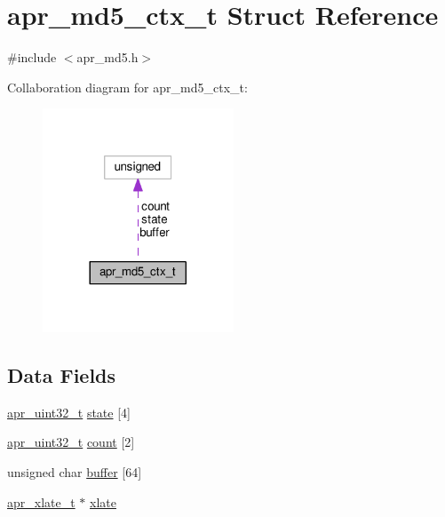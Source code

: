 \hypertarget{structapr__md5__ctx__t}{}\section{apr\+\_\+md5\+\_\+ctx\+\_\+t Struct Reference}
\label{structapr__md5__ctx__t}


{\ttfamily \#include $<$apr\+\_\+md5.\+h$>$}



Collaboration diagram for apr\+\_\+md5\+\_\+ctx\+\_\+t\+:
\nopagebreak
\begin{figure}[H]
\begin{center}
\leavevmode
\includegraphics[width=161pt]{structapr__md5__ctx__t__coll__graph}
\end{center}
\end{figure}
\subsection*{Data Fields}
\begin{DoxyCompactItemize}
\item 
\hyperlink{group__apr__platform_ga558548a135d8a816c4787250744ea147}{apr\+\_\+uint32\+\_\+t} \hyperlink{structapr__md5__ctx__t_ab8acbc6cd7a3dcd16e66e64a7f5357b5}{state} \mbox{[}4\mbox{]}
\item 
\hyperlink{group__apr__platform_ga558548a135d8a816c4787250744ea147}{apr\+\_\+uint32\+\_\+t} \hyperlink{structapr__md5__ctx__t_a3234a76e68a4ef546026a9854f9ba6d0}{count} \mbox{[}2\mbox{]}
\item 
unsigned char \hyperlink{structapr__md5__ctx__t_aed43a8aefc65c8973dbae804c94ad1e3}{buffer} \mbox{[}64\mbox{]}
\item 
\hyperlink{group__APR__XLATE_ga069dabbadc30e3a4157c38104a250e77}{apr\+\_\+xlate\+\_\+t} $\ast$ \hyperlink{structapr__md5__ctx__t_a391a62bc9e7fada71d03f786df4f49ba}{xlate}
\end{DoxyCompactItemize}


